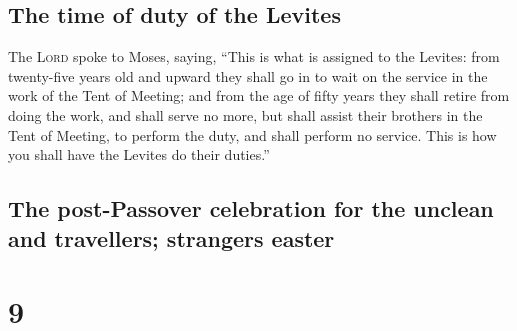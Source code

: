 \hypertarget{the-time-of-duty-of-the-levites}{%
\subsection{The time of duty of the
Levites}\label{the-time-of-duty-of-the-levites}}

 The \textsc{Lord} spoke to Moses, saying,
 ``This is what is assigned to the Levites: from
twenty-five years old and upward they shall go in to wait on the service
in the work of the Tent of Meeting;  and from the age of
fifty years they shall retire from doing the work, and shall serve no
more,  but shall assist their brothers in the Tent of
Meeting, to perform the duty, and shall perform no service. This is how
you shall have the Levites do their duties.''

\hypertarget{the-post-passover-celebration-for-the-unclean-and-travellers-strangers-easter}{%
\subsection{The post-Passover celebration for the unclean and
travellers; strangers
easter}\label{the-post-passover-celebration-for-the-unclean-and-travellers-strangers-easter}}

\hypertarget{section-8}{%
\section{9}\label{section-8}}

